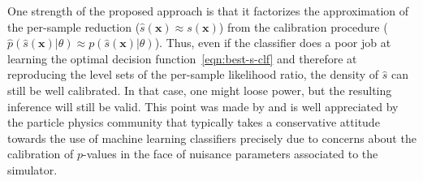 \documentclass[12pt]{article}
\numberwithin{equation}{section}
\theoremstyle{plain}
\begin{document}
One strength of the proposed approach is that it factorizes the approximation of
the per-sample reduction ($\hat{s}(\mathbf{x}) \approx s(\mathbf{x})$) from the
calibration procedure ($\hat p(\hat s(\mathbf{x})| \theta) \approx
p(\hat{s}(\mathbf{x})|\theta)$). Thus, even if the classifier does a poor job at
learning the optimal decision function~\ref{eqn:best-s-clf} and therefore at
reproducing the level sets of the per-sample likelihood ratio, the density of
$\hat{s}$ can still be well calibrated. In that case, one might loose power, but
the resulting inference will still be valid. This point was made by
\cite{Neal:2007zz} and is well appreciated by the particle physics community
that typically takes a conservative attitude towards the use of machine learning
classifiers precisely due to concerns about the calibration of $p$-values in the
face of nuisance parameters associated to the simulator.
\end{document}
